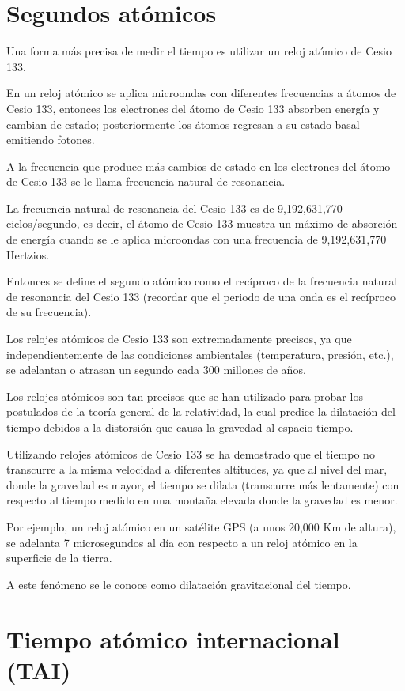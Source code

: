 \documentclass[11pt,a4paper,oneside]{book}
\begin{document}
\section{Segundos atómicos}

Una forma más precisa de medir el tiempo es utilizar un reloj atómico de Cesio 133.

En un reloj atómico se aplica microondas con diferentes frecuencias a átomos de Cesio 133, entonces los electrones del átomo de Cesio 133 absorben energía y cambian de estado; posteriormente los átomos regresan a su estado basal emitiendo fotones.

A la frecuencia que produce más cambios de estado en los electrones del átomo de Cesio 133 se le llama frecuencia natural de resonancia.

La frecuencia natural de resonancia del Cesio 133 es de 9,192,631,770 ciclos/segundo, es decir, el átomo de Cesio 133 muestra un máximo de absorción de energía cuando se le aplica microondas con una frecuencia de 9,192,631,770 Hertzios.

Entonces se define el segundo atómico como el recíproco de la frecuencia natural de resonancia del Cesio 133 (recordar que el periodo de una onda es el recíproco de su frecuencia).

Los relojes atómicos de Cesio 133 son extremadamente precisos, ya que independientemente de las condiciones ambientales (temperatura, presión, etc.), se adelantan o atrasan un segundo cada 300 millones de años.

Los relojes atómicos son tan precisos que se han utilizado para probar los postulados de la teoría general de la relatividad, la cual predice la dilatación del tiempo debidos a la distorsión que causa la gravedad al espacio-tiempo.

Utilizando relojes atómicos de Cesio 133 se ha demostrado que el tiempo no transcurre a la misma velocidad a diferentes altitudes, ya que al nivel del mar, donde la gravedad es mayor, el tiempo se dilata (transcurre más lentamente) con respecto al tiempo medido en una montaña elevada donde la gravedad es menor.

Por ejemplo, un reloj atómico en un satélite GPS (a unos 20,000 Km de altura), se adelanta 7 microsegundos al día con respecto a un reloj atómico en la superficie de la tierra.

A este fenómeno se le conoce como dilatación gravitacional del tiempo.

\section{Tiempo atómico internacional (TAI)}
\end{document}
